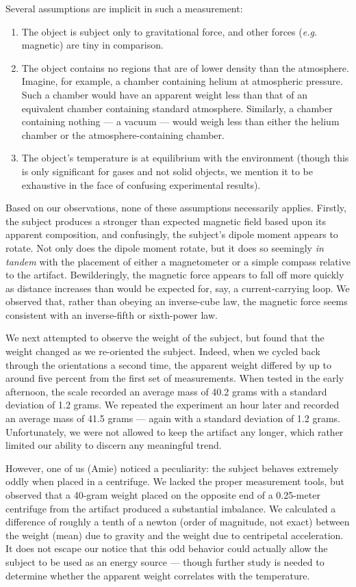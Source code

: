 \documentclass[10pt]{article}
\begin{document}
Several assumptions are implicit in such a measurement:
\begin{enumerate}
\item The object is subject only to gravitational force, and other forces (\textit{e.g.} magnetic) are tiny in comparison.
\item The object contains no regions that are of lower density than the atmosphere. Imagine, for example, a chamber containing helium at atmospheric pressure. Such a chamber would have an apparent weight less than that of an equivalent chamber containing standard atmosphere. Similarly, a chamber containing nothing --- a vacuum --- would weigh less than either the helium chamber or the atmosphere-containing chamber.
\item The object's temperature is at equilibrium with the environment (though this is only significant for gases and not solid objects, we mention it to be exhaustive in the face of confusing experimental results).
\end{enumerate}

Based on our observations, none of these assumptions necessarily applies.
Firstly, the subject produces a stronger than expected magnetic field based upon its apparent composition, and confusingly, the subject's dipole moment appears to rotate.
Not only does the dipole moment rotate, but it does so seemingly \textit{in tandem} with the placement of either a magnetometer or a simple compass relative to the artifact.
Bewilderingly, the magnetic force appears to fall off more quickly as distance increases than would be expected for, say, a current-carrying loop.
We observed that, rather than obeying an inverse-cube law, the magnetic force seems consistent with an inverse-fifth or sixth-power law.

We next attempted to observe the weight of the subject, but found that the weight changed as we re-oriented the subject.
Indeed, when we cycled back through the orientations a second time, the apparent weight differed by up to around five percent from the first set of measurements.
When tested in the early afternoon, the scale recorded an average mass of 40.2 grams with a standard deviation of 1.2 grams.
We repeated the experiment an hour later and recorded an average mass of 41.5 grams --- again with a standard deviation of 1.2 grams.
Unfortunately, we were not allowed to keep the artifact any longer, which rather limited our ability to discern any meaningful trend.

However, one of us (Amie) noticed a peculiarity: the subject behaves extremely oddly when placed in a centrifuge.
We lacked the proper measurement tools, but observed that a 40-gram weight placed on the opposite end of a 0.25-meter centrifuge from the artifact produced a substantial imbalance.
We calculated a difference of roughly a tenth of a newton (order of magnitude, not exact) between the weight (mean) due to gravity and the weight due to centripetal acceleration.
It does not escape our notice that this odd behavior could actually allow the subject to be used as an energy source --- though further study is needed to determine whether the apparent weight correlates with the temperature.
\end{document}
